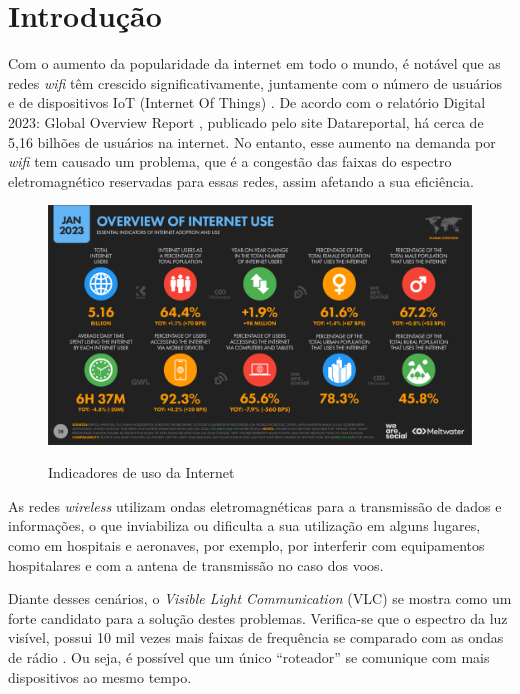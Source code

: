 \chapter{Introdução}

Com o aumento da popularidade da internet em todo o mundo, é notável que as redes \textit{wifi} têm crescido significativamente, juntamente com o número de usuários e de dispositivos IoT (Internet Of Things) \cite{matheus2017comunicaccao}. De acordo com o relatório Digital 2023: Global Overview Report \cite{datareportal}, publicado pelo site Datareportal, há cerca de 5,16 bilhões de usuários na internet. No entanto, esse aumento na demanda por \textit{wifi} tem causado um problema, que é a congestão das faixas do espectro eletromagnético reservadas para essas redes, assim afetando a sua eficiência.\newline

\begin{figure}[!htbp]
  \caption{Indicadores de uso da Internet}
  \includegraphics[scale=0.4]{images/internet_use.png}
  \label{figura:usoInternet}
\end{figure}

As redes \textit{wireless} utilizam ondas eletromagnéticas para a transmissão de dados e informações, o que inviabiliza ou dificulta a sua utilização em alguns lugares, como em hospitais e aeronaves, por exemplo, por interferir com equipamentos hospitalares e com a antena de transmissão no caso dos voos.

Diante desses cenários, o \textit{Visible Light Communication} (VLC) se mostra como um forte candidato para a solução destes problemas.
Verifica-se que o espectro da luz visível, possui 10 mil vezes mais faixas de frequência se comparado com as ondas de rádio \cite[p. 14]{conceiccao2015comunicaccao}.
Ou seja, é possível que um único ``roteador” se comunique com mais dispositivos ao mesmo tempo.

